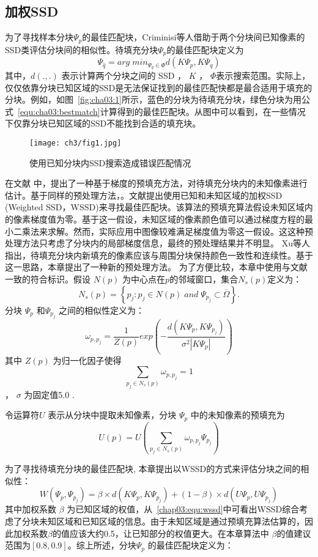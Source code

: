 \subsection{加权SSD}
\label{sec:sub:WSSD}
为了寻找样本分块\(\Psi_p\)的最佳匹配块，Criminisi等人\cite{Criminisi04regionfilling}借助于两个分块间已知像素的SSD类评估分块间的相似性。待填充分块\(\Psi_p\)的最佳匹配块定义为
\begin{equation}
\label{equ:cha03:bestmatch}
\Psi_{\hat{q}}=arg\;min_{\Psi_q\in\Phi}d(K\Psi_p,K\Psi_q)
\end{equation}
其中，\(d(.,.)\) 表示计算两个分块之间的 SSD ， \(K\) ， \(\Phi\)表示搜索范围。实际上，仅仅依靠分块已知区域的SSD是无法保证找到的最佳匹配快都是最合适用于填充的分块。例如，如图~\ref{fig:cha03:1}所示，蓝色的分块为待填充分块，绿色分块为用公式~\ref{equ:cha03:bestmatch}计算得到的最佳匹配块。从图中可以看到，在一些情况下仅靠分块已知区域的SSD不能找到合适的填充块。
\begin{figure}[!htbp]
	\begin{center}
			\texttt{[image: ch3/fig1.jpg]}
	\end{center}
    \caption{使用已知分块内SSD搜索造成错误匹配情况}
	\label{cha03:fig:1}
\end{figure}
在文献 中，提出了一种基于梯度的预填充方法，对待填充分块内的未知像素进行估计。基于同样的预处理方法，。文献提出使用已知和未知区域的加权SSD (Weighted SSD，WSSD)来寻找最佳匹配块。该算法的预填充算法假设未知区域内的像素梯度值为零。基于这一假设，未知区域的像素颜色值可以通过梯度方程的最小二乘法来求解。然而，实际应用中图像较难满足梯度值为零这一假设。这这种预处理方法只考虑了分块内的局部梯度信息，最终的预处理结果并不明显。 Xu等人\cite{Xu:2010}指出，待填充分块内新填充的像素应该与周围分块保持颜色一致性和连续性。基于这一思路，本章提出了一种新的预处理方法。
为了方便比较，本章中使用与文献一致的符合标识。假设 \(N(p)\) 为中心点在\(p\)的邻域窗口，集合\(N_s(p)\)定义为：
$$N_s(p)= \left\{ p_j:p_j \in N(p)\;and\;\Psi_{p_j} \subset \overline{\Omega} \right\}.$$
分块 \(\Psi_p\) 和\(\Psi_{p_j}\)  之间的相似性定义为：
$$\omega_{p,p_{j}}=\frac{1}{Z(p)}exp\left(-\frac{d(K\Psi_p,K\Psi_{p_j})}{\sigma^2\left|K\Psi_p\right|}\right)$$
其中 \(Z(p)\) 为归一化因子使得 $$\sum_{p_j\in N_s(p)}\omega_{p,p_j} = 1$$ ， \(\sigma\) 为固定值5.0 \cite{Xu:2010}.\par
令运算符\(U\) 表示从分块中提取未知像素，分块 \(\Psi_p\) 中的未知像素的预填充为
$$U(p)=U\left(\sum_{p_j \in N_s(p)}{\omega_{p,p_j}\Psi_{p_j}}\right)$$\par
为了寻找待填充分块的最佳匹配块, 本章提出以WSSD的方式来评估分块之间的相似性：
\begin{equation}
W(\Psi_p,\Psi_{p_j})=\beta\times d(K\Psi_p,K\Psi_{p_j})+(1-\beta)\times d(U\Psi_p,U\Psi_{p_j})
\label{chap03:equ:wssd}
\end{equation}
其中加权系数 \(\beta\) 为已知区域的权值，从~\ref{chap03:equ:wssd}中可看出WSSD综合考虑了分块未知区域和已知区域的信息。由于未知区域是通过预填充算法估算的，因此加权系数\(\beta\)的值应该大约0.5，让已知部分的权值更大。在本章算法中 \(\beta\)的值建议范围为$[0.8, 0.9]$。综上所述，分块\(\Psi_p\) 的最佳匹配块定义为：

